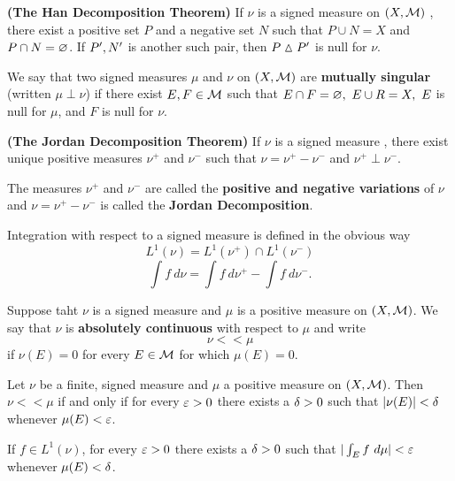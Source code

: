 \begin{thm}\textbf{(The Han Decomposition Theorem)}
If $\nu$ is a signed measure on $(X,\mathcal{M})$ , there exist a positive set $P$ and a negative set $N$ such that $P\cup N = X$ and $P\cap N = \varnothing$. If $P^\prime, N^\prime$ is another such pair, then $P\vartriangle P^\prime$ is null for $\nu$.
\end{thm}

\vs

\dfn We say that two signed measures $\mu$ and $\nu$ on $(X, \mathcal{M})$ are \textbf{mutually singular} (written $\mu \perp \nu$) if there exist $E, F\in \mathcal{M}$ such that $E\cap F = \varnothing,\ E\cup R = X,\ E$ is null for $\mu$, and $F$ is null for $\nu$.

\vs

\begin{thm} \textbf{(The Jordan Decomposition Theorem)} If $\nu$ is a signed measure , there exist unique positive measures $\nu^+$ and $\nu^-$ such that $\nu = \nu^+ - \nu^-$ and $\nu^+\perp \nu^-$.
\end{thm}
\vs

\dfn The measures $\nu^+$ and $\nu^-$ are called the \textbf{positive and negative variations} of $\nu$ and $\nu = \nu^+ - \nu^-$ is called the \textbf{Jordan Decomposition}.

\vs

\dfn Integration with respect to a signed measure is defined in the obvious way
\[L^1(\nu) = L^1(\nu^+)\cap L^1(\nu^-)\]
\[\int f\ d\nu = \int f\ d\nu^+ - \int f\ d\nu^-.\]

\vs 

\dfn Suppose taht $\nu$ is a signed measure and $\mu$ is a positive measure on $(X, \mathcal{M})$. We say that $\nu$ is \textbf{absolutely continuous} with respect to $\mu$ and write 
\[\nu << \mu\]
if $\nu(E) = 0$ for every $E\in \mathcal{M}$ for which $\mu(E) = 0$.

\vs

\begin{thm}
Let $\nu$ be a finite, signed measure and $\mu$ a positive measure on $(X, \mathcal{M})$. Then $\nu << \mu$ if and only if for every $\varepsilon > 0$ there exists a $\delta > 0$ such that $|\nu(E)| < \delta$ whenever $\mu(E) < \varepsilon$.
\end{thm}

\vs

\begin{cor}
If $f\in L^1(\nu)$, for every $\varepsilon > 0$ there exists a $\delta > 0$ such that $|\int_E f\ d\mu| < \varepsilon$ whenever $\mu(E) < \delta$.
\end{cor}


